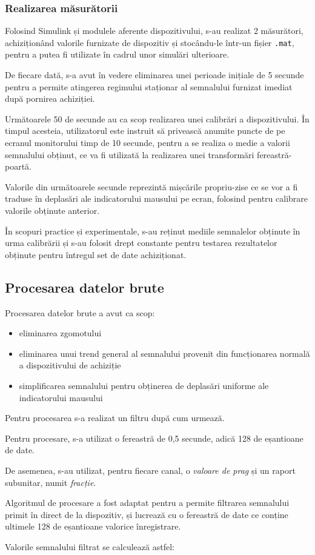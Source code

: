 \documentclass[12pt]{article}
\begin{document}
\begin{multicols}{2}
	\subsubsection*{Realizarea măsurătorii}
	Folosind Simulink și modulele aferente dispozitivului, s-au realizat 2 măsurători, achiziționând valorile furnizate de dispozitiv și stocându-le într-un fișier  {\tt.mat}, pentru a putea fi utilizate în cadrul unor simulări ulterioare.
	
	De fiecare dată, s-a avut în vedere eliminarea unei perioade inițiale de 5 secunde pentru a permite atingerea regimului staționar al semnalului furnizat imediat după pornirea achiziției.
	
	Următoarele 50 de secunde au ca scop realizarea unei calibrări a dispozitivului. În timpul acesteia, utilizatorul este instruit să privească anumite puncte de pe ecranul monitorului timp de 10 secunde, pentru a se realiza o medie a valorii semnalului obținut, ce va fi utilizată la realizarea unei transformări fereastră-poartă.
	
	Valorile din următoarele secunde reprezintă mișcările propriu-zise ce se vor a fi traduse în deplasări ale indicatorului mausului pe ecran, folosind pentru calibrare valorile obținute anterior.
	
	În scopuri practice și experimentale, s-au reținut mediile semnalelor obținute în urma calibrării și s-au folosit drept constante pentru testarea rezultatelor obținute pentru întregul set de date achiziționat.
	
	\subsection* {Procesarea datelor brute}
	Procesarea datelor brute a avut ca scop:
	\begin{itemize}[noitemsep,nolistsep]
		\item eliminarea zgomotului
		\item eliminarea unui trend general al semnalului provenit din funcționarea normală a dispozitivului de achiziție
		\item simplificarea semnalului pentru obținerea de deplasări uniforme ale indicatorului mausului
	\end{itemize}
	
	Pentru procesarea s-a realizat un filtru după cum urmează. 
	
	Pentru procesare, s-a utilizat o fereastră de 0,5 secunde, adică 128 de eșantioane de date.
	
	De asemenea, s-au utilizat, pentru fiecare canal, o \textit{valoare de prag} și un raport subunitar, numit \textit{fracție}.
	
	Algoritmul de procesare a fost adaptat pentru a permite filtrarea semnalului primit în direct de la dispozitiv, și lucrează cu o fereastră de date ce conține ultimele 128 de eșantioane valorice înregistrare.
	
	Valorile semnalului filtrat se calculează astfel:
	\end{multicols}
\end{document}
